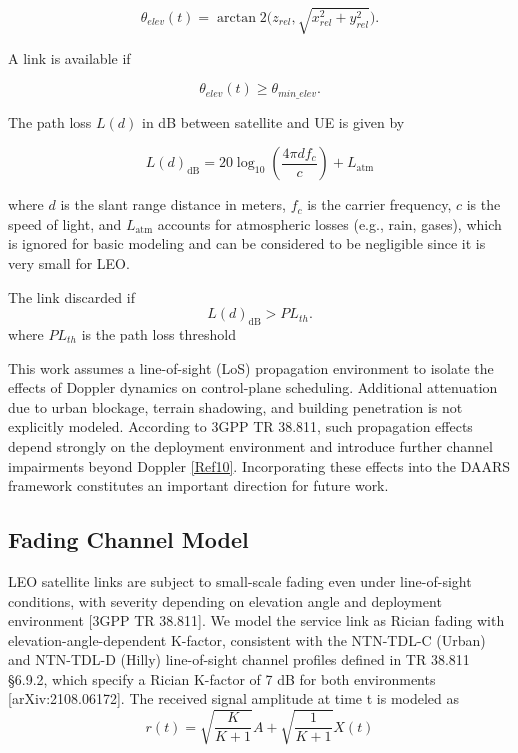 \documentclass[conference]{IEEEtran}
\begin{document}
\begin{equation}
\theta_{elev}(t) = \arctan2 \Big(z_{rel}, \sqrt{x_{rel}^2 + y_{rel}^2}\Big).
\end{equation}

A link is available if

\begin{equation}
\theta_{elev}(t) \geq \theta_{min\_elev}.
\end{equation}

The path loss $L(d)$ in dB between satellite and UE is given by

\begin{equation}
L(d)_{\text{dB}} = 20 \log_{10}\left(\frac{4\pi d f_c}{c}\right) + L_{\text{atm}}
\end{equation}

where $d$ is the slant range distance in meters, $f_c$ is the carrier frequency, $c$ is the speed of light, and $L_{\text{atm}}$ accounts for atmospheric losses (e.g., rain, gases), which is ignored for basic modeling and can be considered to be negligible since it is very small for LEO.

The link discarded if
\begin{equation}
\label{Eqn 7}
L(d)_{\text{dB}} > PL_{th}.
\end{equation}
where $PL_{th}$ is the path loss threshold

This work assumes a line-of-sight (LoS) propagation environment to isolate the effects of Doppler dynamics on control-plane scheduling. Additional attenuation due to urban blockage, terrain shadowing, and building penetration is not explicitly modeled. According to 3GPP TR 38.811, such propagation effects depend strongly on the deployment environment and introduce further channel impairments beyond Doppler \ref{Ref10}. Incorporating these effects into the DAARS framework constitutes an important direction for future work.

\subsection{Fading Channel Model}
LEO satellite links are subject to small-scale fading even under line-of-sight conditions, with severity depending on elevation angle and deployment environment [3GPP TR 38.811]. We model the service link as Rician fading with elevation-angle-dependent K-factor, consistent with the NTN-TDL-C (Urban) and NTN-TDL-D (Hilly) line-of-sight channel profiles defined in TR 38.811 §6.9.2, which specify a Rician K-factor of 7 dB for both environments [arXiv:2108.06172]. The received signal amplitude at time t is modeled as
\begin{equation}
    r(t) = \sqrt{\frac{K}{K+1}}A + \sqrt{\frac{1}{K+1}}X(t)
\end{equation}
\end{document}
